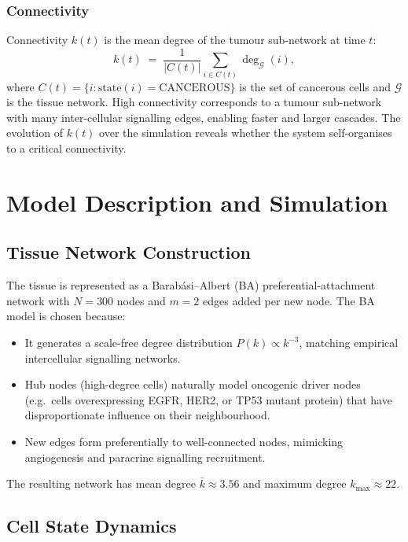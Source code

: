\documentclass[12pt,a4paper]{article}
\begin{document}
\subsubsection{Connectivity}
Connectivity $k(t)$ is the mean degree of the tumour sub-network at time $t$:
\begin{equation}
  k(t) \;=\; \frac{1}{|C(t)|} \sum_{i \in C(t)} \deg_{\mathcal{G}}(i),
\end{equation}
where $C(t) = \{i : \text{state}(i) = \text{CANCEROUS}\}$ is the set of
cancerous cells and $\mathcal{G}$ is the tissue network.  High connectivity
corresponds to a tumour sub-network with many inter-cellular signalling edges,
enabling faster and larger cascades.  The evolution of $k(t)$ over the
simulation reveals whether the system self-organises to a critical connectivity.

\section{Model Description and Simulation}

\subsection{Tissue Network Construction}

The tissue is represented as a Barab\'{a}si--Albert (BA) preferential-attachment
network with $N = 300$ nodes and $m = 2$ edges added per new node.  The BA
model is chosen because:
\begin{itemize}[leftmargin=1.5em]
  \item It generates a scale-free degree distribution $P(k) \propto k^{-3}$,
        matching empirical intercellular signalling networks.
  \item Hub nodes (high-degree cells) naturally model oncogenic driver nodes
        (e.g.\ cells overexpressing EGFR, HER2, or TP53 mutant protein) that
        have disproportionate influence on their neighbourhood.
  \item New edges form preferentially to well-connected nodes, mimicking
        angiogenesis and paracrine signalling recruitment.
\end{itemize}
The resulting network has mean degree $\bar{k} \approx 3.56$ and maximum degree
$k_{\max} \approx 22$.

\subsection{Cell State Dynamics}
\end{document}
